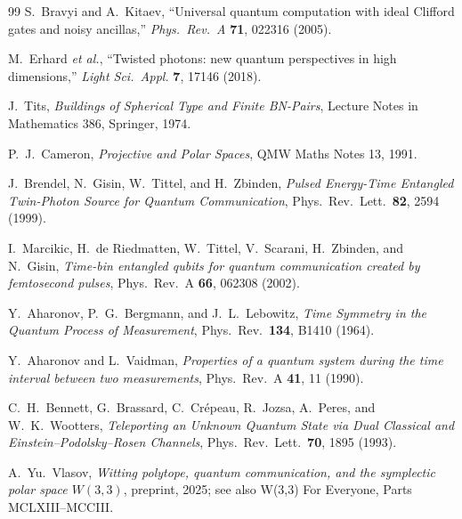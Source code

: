 ﻿\documentclass[12pt]{article}
\begin{document}
\begin{thebibliography}{99}
  S.~Bravyi and A.~Kitaev,
  ``Universal quantum computation with ideal Clifford gates and noisy ancillas,''
  \textit{Phys.~Rev.~A} \textbf{71}, 022316 (2005).

  M.~Erhard \textit{et al.},
  ``Twisted photons: new quantum perspectives in high dimensions,''
  \textit{Light Sci.~Appl.} \textbf{7}, 17146 (2018).

  J.~Tits,
  \textit{Buildings of Spherical Type and Finite BN-Pairs},
  Lecture Notes in Mathematics 386, Springer, 1974.

  P.~J.~Cameron,
  \textit{Projective and Polar Spaces},
  QMW Maths Notes 13, 1991.

  J.~Brendel, N.~Gisin, W.~Tittel, and H.~Zbinden,
  \textit{Pulsed Energy-Time Entangled Twin-Photon Source for Quantum
  Communication},
  Phys.\ Rev.\ Lett.\ \textbf{82}, 2594 (1999).

  I.~Marcikic, H.~de Riedmatten, W.~Tittel, V.~Scarani, H.~Zbinden, and
  N.~Gisin,
  \textit{Time-bin entangled qubits for quantum communication created by
  femtosecond pulses},
  Phys.\ Rev.\ A \textbf{66}, 062308 (2002).

  Y.~Aharonov, P.~G.~Bergmann, and J.~L.~Lebowitz,
  \textit{Time Symmetry in the Quantum Process of Measurement},
  Phys.\ Rev.\ \textbf{134}, B1410 (1964).

  Y.~Aharonov and L.~Vaidman,
  \textit{Properties of a quantum system during the time interval between
  two measurements},
  Phys.\ Rev.\ A \textbf{41}, 11 (1990).

  C.~H.~Bennett, G.~Brassard, C.~Cr\'epeau, R.~Jozsa, A.~Peres, and
  W.~K.~Wootters,
  \textit{Teleporting an Unknown Quantum State via Dual Classical and
  Einstein--Podolsky--Rosen Channels},
  Phys.\ Rev.\ Lett.\ \textbf{70}, 1895 (1993).

  A.~Yu.~Vlasov,
  \textit{Witting polytope, quantum communication, and the symplectic polar
  space $W(3,3)$},
  preprint, 2025; see also W(3,3) For Everyone, Parts MCLXIII--MCCIII.

\end{thebibliography}
\end{document}

